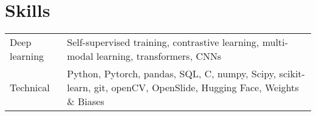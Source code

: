 \documentclass[a4paper,12pt]{article}
\begin{document}
\section{Skills}
\begin{tabularx}{\linewidth}{@{}l X@{}}
Deep learning & \normalsize{Self-supervised training, contrastive learning, multi-modal learning, transformers, CNNs}\\
Technical &  \normalsize{Python, Pytorch, pandas, SQL, C, numpy, Scipy, scikit-learn, git, openCV, OpenSlide, Hugging Face, Weights \& Biases} 
\end{tabularx}


{}
\end{document}
